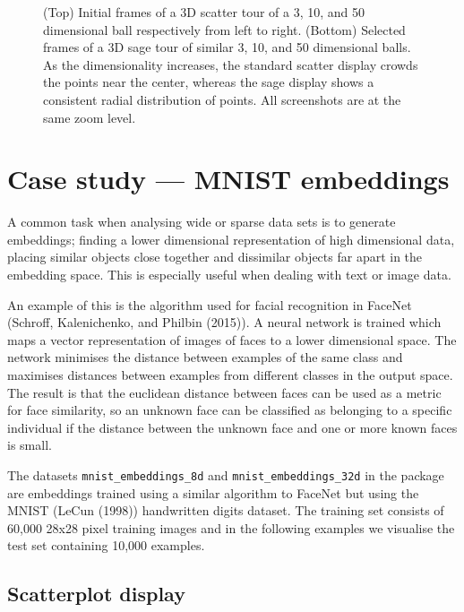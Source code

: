 \begin{figure}
{}

\caption{(Top) Initial frames of a 3D scatter tour of a 3, 10, and 50 dimensional ball respectively from left to right. (Bottom) Selected frames of a 3D sage tour of similar 3, 10, and 50 dimensional balls. As the dimensionality increases, the standard scatter display crowds the points near the center, whereas the sage display shows a consistent radial distribution of points. All screenshots are at the same zoom level.}\label{fig:sage-sphere}
\end{figure}

\hypertarget{case-study-mnist-embeddings}{%
\section{Case study --- MNIST embeddings}\label{case-study-mnist-embeddings}}

A common task when analysing wide or sparse data sets is to generate embeddings; finding a lower dimensional representation of high dimensional data, placing similar objects close together and dissimilar objects far apart in the embedding space. This is especially useful when dealing with text or image data.

An example of this is the algorithm used for facial recognition in FaceNet (Schroff, Kalenichenko, and Philbin (2015)). A neural network is trained which maps a vector representation of images of faces to a lower dimensional space. The network minimises the distance between examples of the same class and maximises distances between examples from different classes in the output space. The result is that the euclidean distance between faces can be used as a metric for face similarity, so an unknown face can be classified as belonging to a specific individual if the distance between the unknown face and one or more known faces is small.

The datasets \texttt{mnist\_embeddings\_8d} and \texttt{mnist\_embeddings\_32d} in the  package are embeddings trained using a similar algorithm to FaceNet but using the MNIST (LeCun (1998)) handwritten digits dataset. The training set consists of 60,000 28x28 pixel training images and in the following examples we visualise the test set containing 10,000 examples.

\hypertarget{scatterplot-display}{%
\subsection{Scatterplot display}\label{scatterplot-display}}

